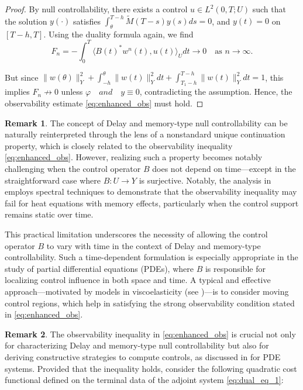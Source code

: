 \documentclass[12pt]{article}
\theoremstyle{plain}
\theoremstyle{definition}
\newtheorem{remark}{Remark}[section]
\begin{document}
\begin{proof}
By null controllability, there exists a control $u \in L^2(0, T; U)$ such that the solution $y(\cdot)$ satisfies  $\int_{\theta}^{T-h} \widetilde{M}(T - s)y(s) ds = 0$, and $y(t) = 0$ on $[T - h, T]$. Using the duality formula again, we find
\[
F_n = -\int_0^T \langle B(t)^* w^n(t), u(t) \rangle_U dt \to 0 \quad \text{as } n \to \infty.
\]

But since $\|w(\theta)\|_Y^2 + \int_{ - h}^{\theta} \|w(t)\|_Y^2 dt+ \int_{T_1 - h}^{T-h} \|w(t)\|_Y^2 dt = 1$, this implies $F_n \not\to 0$ unless $\varphi \quad \textit{and} \quad y \equiv 0$, contradicting the assumption. Hence, the observability estimate \eqref{eq:enhanced_obs} must hold.

\end{proof}


\begin{remark}
\label{rem:2.2}
The concept of Delay and memory-type null controllability can be naturally reinterpreted through the lens of a nonstandard unique continuation property, which is closely related to the observability inequality \eqref{eq:enhanced_obs}. However, realizing such a property becomes notably challenging when the control operator \( B \) does not depend on time—except in the straightforward case where \( B: U \to Y \) is surjective. Notably, the analysis in \cite{guerrero2013remarks} employs spectral techniques to demonstrate that the observability inequality may fail for heat equations with memory effects, particularly when the control support remains static over time.
\end{remark}

This practical limitation underscores the necessity of allowing the control operator \( B \) to vary with time in the context of Delay and memory-type controllability. Such a time-dependent formulation is especially appropriate in the study of partial differential equations (PDEs), where \( B \) is responsible for localizing control influence in both space and time. A typical and effective approach—motivated by models in viscoelasticity (see \cite{chaves2014null})—is to consider moving control regions, which help in satisfying the strong observability condition stated in \eqref{eq:enhanced_obs}.

\begin{remark}
\label{rem:2.3}
The observability inequality in \eqref{eq:enhanced_obs} is crucial not only for characterizing Delay and memory-type null controllability but also for deriving constructive strategies to compute controls, as discussed in \cite{zuazua2007controllability} for PDE systems. Provided that the inequality holds, consider the following quadratic cost functional defined on the terminal data of the adjoint system \eqref{eq:dual_eq_1}:
\end{remark}
\end{document}
